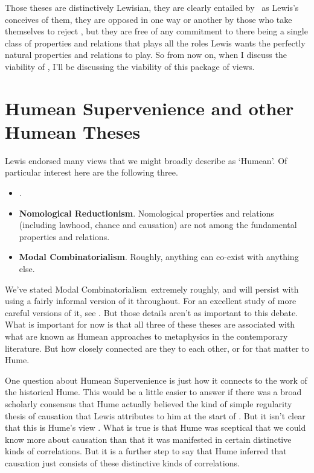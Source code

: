 \noindent Those theses are distinctively Lewisian, they are clearly entailed by \HS\ as Lewis's conceives of them, they are opposed in one way or another by those who take themselves to reject \HS, but they are free of any commitment to there being a single class of properties and relations that plays all the roles Lewis wants the perfectly natural properties and relations to play. So from now on, when I discuss the viability of \HS, I'll be discussing the viability of this package of views.

\section{Humean Supervenience and other Humean Theses}

Lewis endorsed many views that we might broadly describe as `Humean'. Of particular interest here are the following three.

\begin{itemize}
\item \textbf{\HS}.
\item \textbf{Nomological Reductionism}. Nomological properties and relations (including lawhood, chance and causation) are not among the fundamental properties and relations.
\item \textbf{Modal Combinatorialism}. Roughly, anything can co-exist with anything else.
\end{itemize}

\newcommand{\NR}{Nomological Reductionism}
\newcommand{\MC}{Modal Combinatorialism}

\noindent We've stated \MC\ extremely roughly, and will persist with using a fairly informal version of it throughout. For an excellent study of more careful versions of it, see \citet{Nolan1996-NOLRU}. But those details aren't as important to this debate. What is important for now is that all three of these theses are associated with what are known as Humean approaches to metaphysics in the contemporary literature. But how closely connected are they to each other, or for that matter to Hume.

One question about Humean Supervenience is just how it connects to the work of the historical Hume. This would be a little easier to answer if there was a broad scholarly consensus that Hume actually believed the kind of simple regularity thesis of causation that Lewis attributes to him at the start of \citet{Lewis1973b}. But it isn't clear that this is Hume's view \citep{Strawson2000}. What is true is that Hume was sceptical that we could know more about causation than that it was manifested in certain distinctive kinds of correlations. But it is a further step to say that Hume inferred that causation just consists of these distinctive kinds of correlations. 


